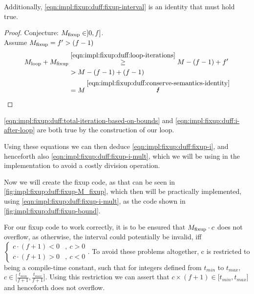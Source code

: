 Additionally, \cref{eqn:impl:fixup:duff:fixup-interval} is an identity that must hold true.
\begin{proof}\label{proof:impl:fixup:duff:fixup-interval}
    Conjecture: $M_{\text{fixup}} \in \rbrack 0,  f \rbrack$.\\

    Assume $M_{\text{fixup}} = f' > (f - 1)$
    \begin{align*}
        \Mloop + \Mfixup &\overset{\ref{eqn:impl:fixup:duff:loop-iterations}}{\geq} M - (f - 1) + f' \\
        &> M - (f - 1) + (f - 1) \\
        &= M \medspace \overset{\ref{eqn:impl:fixup:duff:conserve-semantics-identity}}{\mLightning}
    \end{align*}
\end{proof}

\cref{eqn:impl:fixup:duff:total-iteration-based-on-bounds} and \cref{eqn:impl:fixup:duff:i-after-loop} are both true by the construction of our loop.

Using these equations we can then deduce \cref{eqn:impl:fixup:duff:fixup-i}, and henceforth also \cref{eqn:impl:fixup:duff:fixup-i-mult}, which we will be using in the implementation to avoid a costly division operation.

Now we will create the fixup code, as that can be seen in \cref{fig:impl:fixup:duff:fixup-M_fixup}, which then will be practically implemented, using \cref{eqn:impl:fixup:duff:fixup-i-mult}, as the code shown in \cref{fig:impl:fixup:duff:fixup-bound}.





For our fixup code to work correctly, it is to be ensured that $M_{\text{fixup}} \cdot c$ does not overflow, as otherwise, the interval \cinterval could potentially be invalid, iff $
\begin{cases}
    c \cdot (f + 1) < 0 &, \medspace c > 0\\
    c \cdot (f + 1) > 0 &, \medspace c < 0
\end{cases}$.
To avoid these problems altogether, c is restricted to being a compile-time constant, such that for integers defined from $t_{min}$ to $t_{max}$, $c \in \lbrack \frac{t_{min}}{f + 1}, \frac{t_{max}}{f + 1} \rbrack$.
Using this restriction we can assert that $c \times (f + 1) \in \lbrack t_{min}, t_{max} \rbrack$ and henceforth does not overflow.


